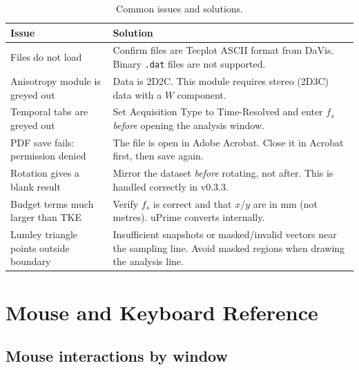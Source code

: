 \documentclass[11pt, a4paper]{report}
\begin{document}
\begin{table}[htbp]
\centering
\caption{Common issues and solutions.}
\begin{tabular}{p{5.2cm}p{8.8cm}}
\toprule
\textbf{Issue} & \textbf{Solution} \\
\midrule
Files do not load & Confirm files are Tecplot ASCII format from DaVis. Binary \texttt{.dat} files are not supported. \\
\addlinespace
Anisotropy module is greyed out & Data is 2D2C. This module requires stereo (2D3C) data with a $W$ component. \\
\addlinespace
Temporal tabs are greyed out & Set Acquisition Type to Time-Resolved and enter $f_s$ \emph{before} opening the analysis window. \\
\addlinespace
PDF save fails: permission denied & The file is open in Adobe Acrobat. Close it in Acrobat first, then save again. \\
\addlinespace
Rotation gives a blank result & Mirror the dataset \emph{before} rotating, not after. This is handled correctly in v0.3.3. \\
\addlinespace
Budget terms much larger than TKE & Verify $f_s$ is correct and that $x$/$y$ are in mm (not metres). uPrime converts internally. \\
\addlinespace
Lumley triangle points outside boundary & Insufficient snapshots or masked/invalid vectors near the sampling line. Avoid masked regions when drawing the analysis line. \\
\bottomrule
\end{tabular}
\end{table}

\chapter{Mouse and Keyboard Reference}

\section{Mouse interactions by window}
\end{document}
